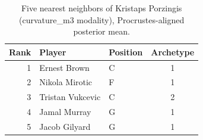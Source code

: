 \begin{table}[htbp]
  \centering\small
  \begin{tabular}{rllc}
    \toprule
    Rank & Player & Position & Archetype \\
    \midrule
    1 & Ernest Brown & C & 1 \\
    2 & Nikola Mirotic & F & 1 \\
    3 & Tristan Vukcevic & C & 2 \\
    4 & Jamal Murray & G & 1 \\
    5 & Jacob Gilyard & G & 1 \\
    \bottomrule
  \end{tabular}
  \caption{Five nearest neighbors of Kristaps Porzingis (curvature_m3 modality), Procrustes-aligned posterior mean.}
  \label{tab:Kristaps_Porzingis_neighbors_curvature_m3}
\end{table}

